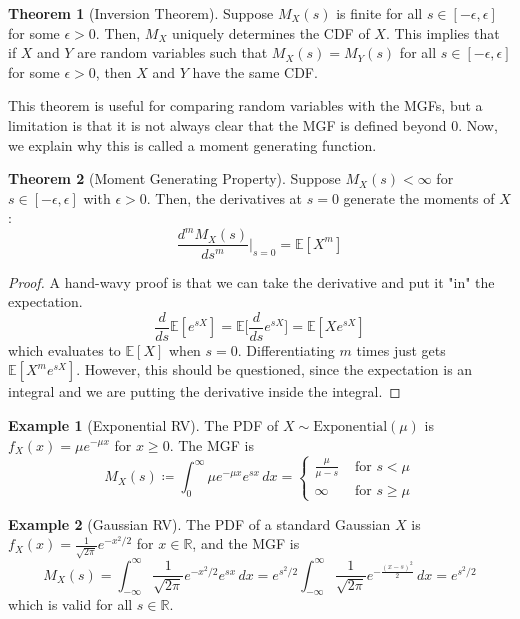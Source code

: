 \documentclass{article}
\theoremstyle{definition}
\newtheorem{theorem}{Theorem}[section]
\newtheorem{example}{Example}[section]
\theoremstyle{remark}
\theoremstyle{definition}
\begin{document}
\begin{theorem}[Inversion Theorem]
Suppose $M_X (s)$ is finite for all $s \in [-\epsilon, \epsilon]$ for some $\epsilon > 0$. Then, $M_X$ uniquely determines the CDF of $X$. This implies that if $X$ and $Y$ are random variables such that $M_X (s) = M_Y (s)$ for all $s \in [-\epsilon, \epsilon]$ for some $\epsilon > 0$, then $X$ and $Y$ have the same CDF. 
\end{theorem}

This theorem is useful for comparing random variables with the MGFs, but a limitation is that it is not always clear that the MGF is defined beyond $0$. Now, we explain why this is called a moment generating function. 

\begin{theorem}[Moment Generating Property]
Suppose $M_X (s) < \infty$ for $s \in [-\epsilon, \epsilon]$ with $\epsilon > 0$. Then, the derivatives at $s = 0$ generate the moments of $X$: 
\[\frac{d^m M_X (s)}{d s^m} \bigg|_{s = 0} = \mathbb{E}[X^m]\]
\end{theorem}
\begin{proof}
A hand-wavy proof is that we can take the derivative and put it "in" the expectation. 
\[\frac{d}{ds} \mathbb{E}[e^{s X}] = \mathbb{E} \big[ \frac{d}{ds} e^{s X} \big] = \mathbb{E}[X e^{s X}]\]
which evaluates to $\mathbb{E}[X]$ when $s = 0$. Differentiating $m$ times just gets $\mathbb{E}[X^m e^{s X}]$. However, this should be questioned, since the expectation is an integral and we are putting the derivative inside the integral. 
\end{proof}

\begin{example}[Exponential RV]
The PDF of $X \sim \mathrm{Exponential}(\mu)$ is $f_X (x) = \mu e^{-\mu x}$ for $x \geq 0$. The MGF is 
\[M_X (s) \coloneqq \int_0^\infty \mu e^{-\mu x} e^{s x} \, dx = \begin{cases} 
    \frac{\mu}{\mu - s} & \text{ for } s < \mu \\
    \infty & \text{ for } s \geq \mu 
\end{cases} \]
\end{example}

\begin{example}[Gaussian RV]
The PDF of a standard Gaussian $X$ is $f_X (x) = \frac{1}{\sqrt{2\pi}} e^{-x^2 / 2}$ for $x \in \mathbb{R}$, and the MGF is 
\[M_X (s) = \int_{-\infty}^\infty \frac{1}{\sqrt{2 \pi}} e^{- x^2 / 2} e^{s x} \,dx = e^{s^2 / 2} \int_{-\infty}^\infty \frac{1}{\sqrt{2\pi}} e^{-\frac{(x - s)^2}{2}}\,dx = e^{s^2 / 2}\]
which is valid for all $s \in \mathbb{R}$. 
\end{example}
\end{document}
